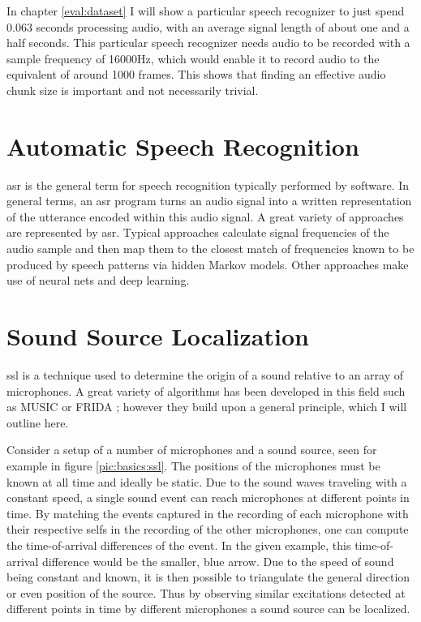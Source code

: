 In chapter \ref{eval:dataset} I will show a particular speech recognizer to just spend 0.063 seconds processing audio, with an average signal length of about one and a half seconds.
This particular speech recognizer needs audio to be recorded with a sample frequency of 16000Hz, which would enable it to record audio to the equivalent
of around 1000 frames. %
This shows that finding an effective audio chunk size is important and not necessarily trivial.

\section{Automatic Speech Recognition}
\gls{asr} is the general term for speech recognition typically performed by software.
In general terms, an \gls{asr} program turns an audio signal into a written representation of the utterance encoded within this audio signal.
A great variety of approaches are represented by \gls{asr}.
Typical approaches calculate signal frequencies of the audio sample and then map them to the closest match of frequencies known to be produced by speech patterns via hidden Markov models.
Other approaches make use of neural nets and deep learning.

\section{Sound Source Localization}
\label{basics:ssl}
\gls{ssl} is a technique used to determine the origin of a sound relative to an array of microphones.
A great variety of algorithms has been developed in this field such as MUSIC \cite{music} or FRIDA \cite{7952744}; however they build upon a general principle, which I will outline here.

Consider a setup of a number of microphones and a sound source, seen for example in figure \ref{pic:basics:ssl}.
The positions of the microphones must be known at all time and ideally be static.
Due to the sound waves traveling with a constant speed, a single sound event can reach microphones at different points in time.
By matching the events captured in the recording of each microphone with their respective selfs in the recording of the other microphones, one can compute the time-of-arrival differences of the event.
In the given example, this time-of-arrival difference would be the smaller, blue arrow.
Due to the speed of sound being constant and known, it is then possible to triangulate the general direction or even position of the source.
Thus by observing similar excitations detected at different points in time by different microphones a sound source can be localized.

